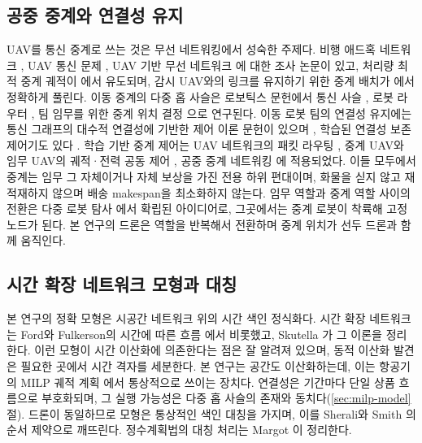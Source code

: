 \documentclass[final,5p,times,twocolumn]{elsarticle}
\begin{document}
\subsection{공중 중계와 연결성 유지}
\label{sec:rel-relay}
UAV를 통신 중계로 쓰는 것은 무선 네트워킹에서 성숙한 주제다. 비행 애드혹 네트워크
\cite{bekmezci2013}, UAV 통신 문제 \cite{gupta2016}, UAV 기반 무선 네트워크 \cite{mozaffari2019}에
대한 조사 논문이 있고, 처리량 최적 중계 궤적이 \cite{zeng2016}에서 유도되며, 감시 UAV와의 링크를
유지하기 위한 중계 배치가 \cite{burdakov2010}에서 정확하게 풀린다. 이동 중계의 다중 홉 사슬은
로보틱스 문헌에서 통신 사슬 \cite{dixon2009}, 로봇 라우터 \cite{tekdas2010}, 팀 임무를 위한 중계
위치 결정 \cite{yanmaz2022}으로 연구된다. 이동 로봇 팀의 연결성 유지에는 통신 그래프의 대수적
연결성에 기반한 제어 이론 문헌이 있으며 \cite{zavlanos2007,zavlanos2011}, 학습된 연결성 보존
제어기도 있다 \cite{li2021}. 학습 기반 중계 제어는 UAV 네트워크의 패킷 라우팅 \cite{ding2022},
중계 UAV와 임무 UAV의 궤적·전력 공동 제어 \cite{mutto2024}, 공중 중계 네트워킹 \cite{maen2024}에
적용되었다. 이들 모두에서 중계는 임무 그 자체이거나 자체 보상을 가진 전용 하위 편대이며, 화물을
싣지 않고 재적재하지 않으며 배송 makespan을 최소화하지 않는다. 임무 역할과 중계 역할 사이의
전환은 다중 로봇 탐사 \cite{dehoog2009,cesare2015}에서 확립된 아이디어로, 그곳에서는 중계 로봇이
착륙해 고정 노드가 된다. 본 연구의 드론은 역할을 반복해서 전환하며 중계 위치가 선두 드론과 함께
움직인다.

\subsection{시간 확장 네트워크 모형과 대칭}
\label{sec:rel-tenet}
본 연구의 정확 모형은 시공간 네트워크 위의 시간 색인 정식화다. 시간 확장 네트워크는 Ford와
Fulkerson의 시간에 따른 흐름 \cite{ford1962}에서 비롯했고, Skutella \cite{skutella2009}가 그
이론을 정리한다. 이런 모형이 시간 이산화에 의존한다는 점은 잘 알려져 있으며, 동적 이산화 발견
\cite{boland2017}은 필요한 곳에서 시간 격자를 세분한다. 본 연구는 공간도 이산화하는데, 이는
항공기의 MILP 궤적 계획 \cite{richards2002}에서 통상적으로 쓰이는 장치다. 연결성은 기간마다 단일
상품 흐름으로 부호화되며, 그 실행 가능성은 다중 홉 사슬의 존재와 동치다(\ref{sec:milp-model}절).
드론이 동일하므로 모형은 통상적인 색인 대칭을 가지며, 이를 Sherali와 Smith \cite{sherali2001}의
순서 제약으로 깨뜨린다. 정수계획법의 대칭 처리는 Margot \cite{margot2010}이 정리한다.
\end{document}
